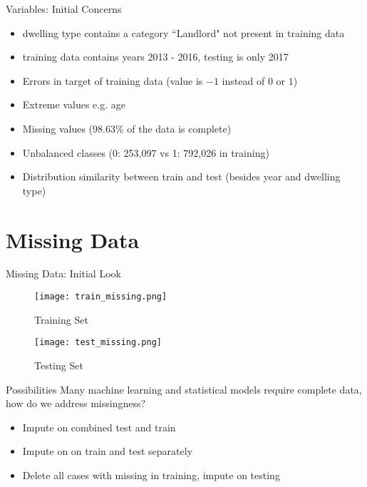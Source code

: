 \documentclass{beamer}
\begin{document}
\begin{frame}{Variables: Initial Concerns}
\begin{itemize}
	\item dwelling type contains a category ``Landlord" not present in training data
	\item training data contains years 2013 - 2016, testing is only 2017
	\item Errors in target of training data (value is $-1$ instead of $0$ or $1$)
	\item Extreme values e.g. age
	\item Missing values ($98.63\%$ of the data is complete)
	\item Unbalanced classes (0: 253,097 vs 1: 792,026 in training)
	\item Distribution similarity between train and test (besides year and dwelling type)
\end{itemize}

\end{frame}

\section{Missing Data}
\begin{frame}{Missing Data: Initial Look}
\begin{figure}[H]
    \centering
    \begin{minipage}{.5\linewidth}
        \centering
        \texttt{[image: train\_missing.png]}
        \caption{Training Set}
        \label{fig:train_miss}
    \end{minipage}%
    \begin{minipage}{0.5\linewidth}
        \centering
        \texttt{[image: test\_missing.png]}
        \caption{Testing Set}
        \label{fig:test_miss}
    \end{minipage}
\end{figure}
\end{frame}

\begin{frame}{Possibilities}
Many machine learning and statistical models require complete data, how do we address missingness?
\begin{itemize}
	\item Impute on combined test and train
	\item Impute on on train and test separately
	\item Delete all cases with missing in training, impute on testing
\end{itemize}
\end{frame}
\end{document}
